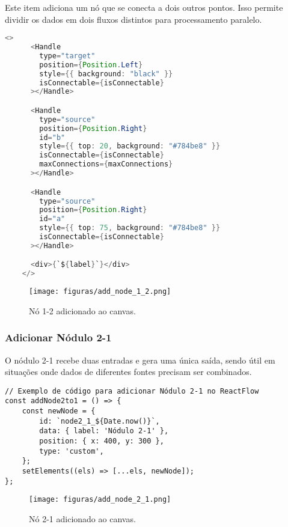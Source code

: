Este item adiciona um nó que se conecta a dois outros pontos. Isso permite dividir os dados em dois fluxos distintos para processamento paralelo.

\begin{lstlisting}[language=Java, caption=Nódulo customizado de exemplo]
    <>
      <Handle
        type="target"
        position={Position.Left}
        style={{ background: "black" }}
        isConnectable={isConnectable}
      ></Handle>

      <Handle
        type="source"
        position={Position.Right}
        id="b"
        style={{ top: 20, background: "#784be8" }}
        isConnectable={isConnectable}
        maxConnections={maxConnections}
      ></Handle>

      <Handle
        type="source"
        position={Position.Right}
        id="a"
        style={{ top: 75, background: "#784be8" }}
        isConnectable={isConnectable}
      ></Handle>

      <div>{`${label}`}</div>
    </>
\end{lstlisting}

\begin{figure}[htbp]
    \centering
    \texttt{[image: figuras/add\_node\_1\_2.png]}
    \caption{Nó 1-2 adicionado ao canvas.}
    \label{Fig:AddNode1to2}
\end{figure}

\subsubsection{Adicionar Nódulo 2-1}

O nódulo 2-1 recebe duas entradas e gera uma única saída, sendo útil em situações onde dados de diferentes fontes precisam ser combinados.

\begin{verbatim}
// Exemplo de código para adicionar Nódulo 2-1 no ReactFlow
const addNode2to1 = () => {
    const newNode = {
        id: `node2_1_${Date.now()}`,
        data: { label: 'Nódulo 2-1' },
        position: { x: 400, y: 300 },
        type: 'custom',
    };
    setElements((els) => [...els, newNode]);
};
\end{verbatim}

\begin{figure}[htbp]
    \centering
    \texttt{[image: figuras/add\_node\_2\_1.png]}
    \caption{Nó 2-1 adicionado ao canvas.}
    \label{Fig:AddNode2to1}
\end{figure}

